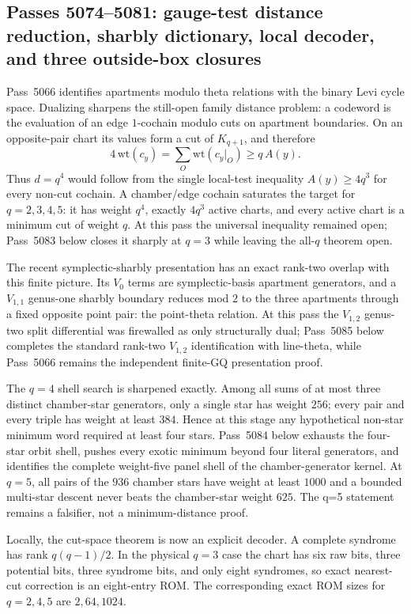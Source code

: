 \ifdefined\WPassFiveZeroSevenFourLoaded\else
\gdef\WPassFiveZeroSevenFourLoaded{1}
\subsection*{Passes 5074--5081: gauge-test distance reduction, sharbly dictionary, local decoder, and three outside-box closures}
Pass~5066 identifies apartments modulo theta relations with the binary Levi cycle space. Dualizing sharpens the still-open family distance problem: a codeword is the evaluation of an edge $1$-cochain modulo cuts on apartment boundaries. On an opposite-pair chart its values form a cut of $K_{q+1}$, and therefore
\[
  4\,\mathrm{wt}(c_y)=\sum_O \mathrm{wt}(c_y|_O)
  \ge q\,A(y).
\]
Thus $d=q^4$ would follow from the single local-test inequality $A(y)\ge4q^3$ for every non-cut cochain. A chamber/edge cochain saturates the target for $q=2,3,4,5$: it has weight $q^4$, exactly $4q^3$ active charts, and every active chart is a minimum cut of weight $q$. At this pass the universal inequality remained open; Pass~5083 below closes it sharply at $q=3$ while leaving the all-$q$ theorem open.

The recent symplectic-sharbly presentation has an exact rank-two overlap with this finite picture. Its $V_0$ terms are symplectic-basis apartment generators, and a $V_{1,1}$ genus-one sharbly boundary reduces mod $2$ to the three apartments through a fixed opposite point pair: the point-theta relation. At this pass the $V_{1,2}$ genus-two split differential was firewalled as only structurally dual; Pass~5085 below completes the standard rank-two $V_{1,2}$ identification with line-theta, while Pass~5066 remains the independent finite-GQ presentation proof.

The $q=4$ shell search is sharpened exactly. Among all sums of at most three distinct chamber-star generators, only a single star has weight $256$; every pair and every triple has weight at least $384$. Hence at this stage any hypothetical non-star minimum word required at least four stars. Pass~5084 below exhausts the four-star orbit shell, pushes every exotic minimum beyond four literal generators, and identifies the complete weight-five panel shell of the chamber-generator kernel. At $q=5$, all pairs of the $936$ chamber stars have weight at least $1000$ and a bounded multi-star descent never beats the chamber-star weight $625$. The q=5 statement remains a falsifier, not a minimum-distance proof.

Locally, the cut-space theorem is now an explicit decoder. A complete syndrome has rank $q(q-1)/2$. In the physical $q=3$ case the chart has six raw bits, three potential bits, three syndrome bits, and only eight syndromes, so exact nearest-cut correction is an eight-entry ROM. The corresponding exact ROM sizes for $q=2,4,5$ are $2,64,1024$.

